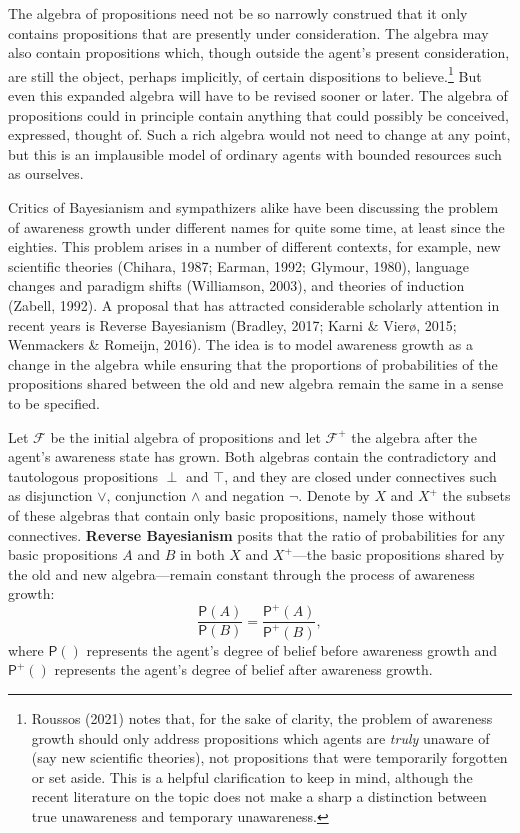 \documentclass[
  11pt,
  dvipsnames,enabledeprecatedfontcommands]{scrartcl}
\newcommand{\pr}[1]{\ensuremath{\mathsf{P}(#1)}}
\newcommand{\ppr}[2]{\ensuremath{\mathsf{P}^{#1}(#2)}}
\begin{document}
The algebra of propositions need not be so narrowly construed that it
only contains propositions that are presently under consideration. The
algebra may also contain propositions which, though outside the agent's
present consideration, are still the object, perhaps implicitly, of
certain dispositions to believe.\footnote{Roussos (2021) notes that, for
  the sake of clarity, the problem of awareness growth should only
  address propositions which agents are \emph{truly} unaware of (say new
  scientific theories), not propositions that were temporarily forgotten
  or set aside. This is a helpful clarification to keep in mind,
  although the recent literature on the topic does not make a sharp a
  distinction between true unawareness and temporary unawareness.} But
even this expanded algebra will have to be revised sooner or later. The
algebra of propositions could in principle contain anything that could
possibly be conceived, expressed, thought of. Such a rich algebra would
not need to change at any point, but this is an implausible model of
ordinary agents with bounded resources such as ourselves.

Critics of Bayesianism and sympathizers alike have been discussing the
problem of awareness growth under different names for quite some time,
at least since the eighties. This problem arises in a number of
different contexts, for example, new scientific theories (Chihara, 1987;
Earman, 1992; Glymour, 1980), language changes and paradigm shifts
(Williamson, 2003), and theories of induction (Zabell, 1992). A proposal
that has attracted considerable scholarly attention in recent years is
Reverse Bayesianism (Bradley, 2017; Karni \& Vierø, 2015; Wenmackers \&
Romeijn, 2016). The idea is to model awareness growth as a change in the
algebra while ensuring that the proportions of probabilities of the
propositions shared between the old and new algebra remain the same in a
sense to be specified.

Let \(\mathcal{F}\) be the initial algebra of propositions and let
\(\mathcal{F}^+\) the algebra after the agent's awareness state has
grown. Both algebras contain the contradictory and tautologous
propositions \(\perp\) and \(\top\), and they are closed under
connectives such as disjunction \(\vee\), conjunction \(\wedge\) and
negation \(\neg\). Denote by \(X\) and \(X^+\) the subsets of these
algebras that contain only basic propositions, namely those without
connectives. \textbf{Reverse Bayesianism} posits that the ratio of
probabilities for any basic propositions \(A\) and \(B\) in both \(X\)
and \(X^+\)---the basic propositions shared by the old and new
algebra---remain constant through the process of awareness growth:
\[\frac{\pr{A}}{\pr{B}} = \frac{\ppr{+}{A}}{\ppr{+}{B}},\] where
\(\pr{}\) represents the agent's degree of belief before awareness
growth and \(\ppr{+}{}\) represents the agent's degree of belief after
awareness growth.
\end{document}
